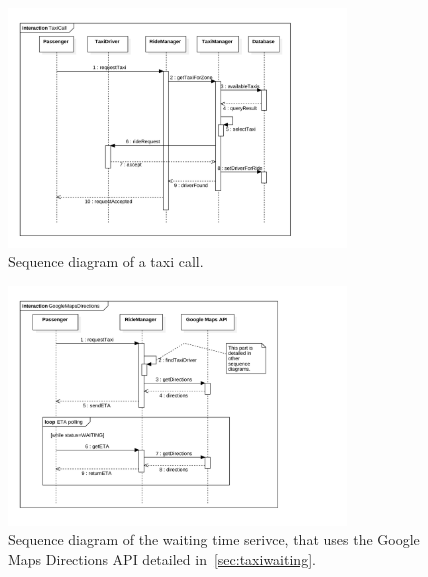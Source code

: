 \begin{figure}[h]
    \centering
    \includegraphics[width=0.8\textwidth]{diagrams/sequence_taxicall}
    \caption{Sequence diagram of a taxi call.}
    \label{fig:sequence-taxicall}
\end{figure}

\begin{figure}[h]
    \centering
    \includegraphics[width=0.8\textwidth]{diagrams/sequence_gmaps}
    \caption{Sequence diagram of the waiting time serivce, that uses the Google Maps Directions API detailed in~\autoref{sec:taxiwaiting}.}
    \label{fig:sequence-gmaps}
\end{figure}

\FloatBarrier
